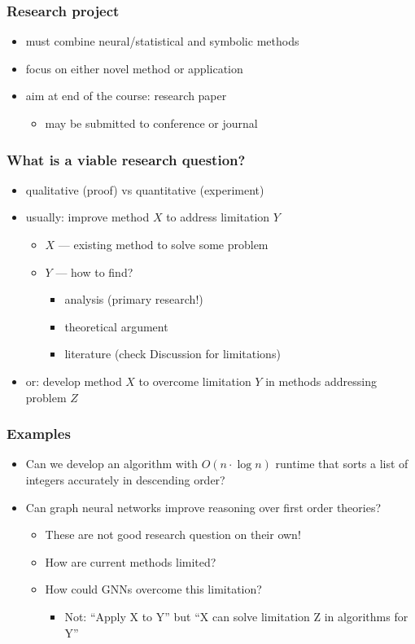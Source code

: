 \documentclass{beamer}
\begin{document}
\begin{frame}
  \frametitle{Research project}
  \begin{itemize}
  \item must combine neural/statistical and symbolic methods
  \item focus on either novel method or application
  \item aim at end of the course: research paper
    \begin{itemize}
    \item may be submitted to conference or journal
    \end{itemize}
  \end{itemize}
\end{frame}

\begin{frame}
  \frametitle{What is a viable research question?}
  \begin{itemize}
  \item qualitative (proof) vs quantitative (experiment)
  \item usually: improve method $X$ to address limitation $Y$
    \begin{itemize}
    \item $X$ --- existing method to solve some problem
    \item $Y$ --- how to find?
      \begin{itemize}
      \item analysis (primary research!)
      \item theoretical argument
      \item literature (check Discussion for limitations)
      \end{itemize}
    \end{itemize}
  \item or: develop method $X$ to overcome limitation $Y$ in methods
    addressing problem $Z$
  \end{itemize}
\end{frame}

\begin{frame}
  \frametitle{Examples}
  \begin{itemize}
  \item Can we develop an algorithm with $O(n \cdot \log{n})$ runtime
    that sorts a list of integers accurately in descending order?
    \pause
  \item Can graph neural networks improve reasoning over first order
    theories?
    \pause
    \begin{itemize}
    \item These are not good research question on their own!
    \item How are current methods limited?
    \item How could GNNs overcome this limitation?
      \begin{itemize}
      \item Not: ``Apply X to Y'' but ``X can solve limitation Z in
        algorithms for Y''
      \end{itemize}
    \end{itemize}
  \end{itemize}
\end{frame}
\end{document}
